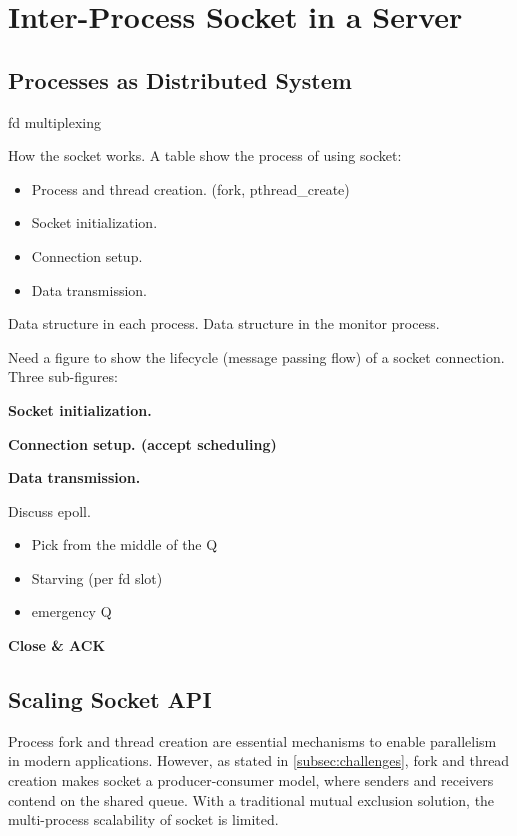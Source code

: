\section{Inter-Process Socket in a Server}
\label{sec:intra-server}

\subsection{Processes as Distributed System}
\label{subsec:socket-api}

fd multiplexing

How the socket works. A table show the process of using socket:

\begin{itemize}
	\item Process and thread creation. (fork, pthread\_create)
	\item Socket initialization.
	\item Connection setup.
	\item Data transmission.
\end{itemize}


Data structure in each process. Data structure in the monitor process.

Need a figure to show the lifecycle (message passing flow) of a socket connection. Three sub-figures:


	 \textbf{Socket initialization.}
	  
	 \textbf{Connection setup. (accept scheduling)}
	 
	 \textbf{Data transmission.}
	 
	 Discuss epoll.
\begin{itemize}
	\item Pick from the middle of the Q
	\item Starving (per fd slot)
	\item emergency Q
\end{itemize}

    \textbf{Close \& ACK}


\subsection{Scaling Socket API}
\label{subsec:fork}

Process fork and thread creation are essential mechanisms to enable parallelism in modern applications. 
However, as stated in \ref{subsec:challenges}, fork and thread creation makes socket a producer-consumer model, where senders and receivers contend on the shared queue. With a traditional mutual exclusion solution, the multi-process scalability of socket is limited.

